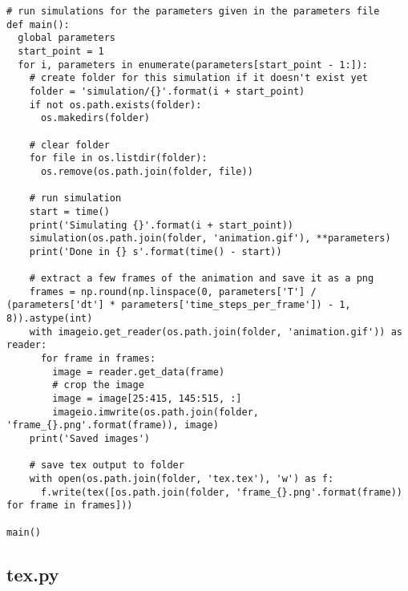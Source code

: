 \begin{verbatim}
# run simulations for the parameters given in the parameters file
def main():
  global parameters
  start_point = 1
  for i, parameters in enumerate(parameters[start_point - 1:]):
    # create folder for this simulation if it doesn't exist yet
    folder = 'simulation/{}'.format(i + start_point)
    if not os.path.exists(folder):
      os.makedirs(folder)
    
    # clear folder
    for file in os.listdir(folder):
      os.remove(os.path.join(folder, file))

    # run simulation
    start = time()
    print('Simulating {}'.format(i + start_point))
    simulation(os.path.join(folder, 'animation.gif'), **parameters)
    print('Done in {} s'.format(time() - start))

    # extract a few frames of the animation and save it as a png
    frames = np.round(np.linspace(0, parameters['T'] / (parameters['dt'] * parameters['time_steps_per_frame']) - 1, 8)).astype(int)
    with imageio.get_reader(os.path.join(folder, 'animation.gif')) as reader:
      for frame in frames:
        image = reader.get_data(frame)
        # crop the image
        image = image[25:415, 145:515, :]
        imageio.imwrite(os.path.join(folder, 'frame_{}.png'.format(frame)), image)
    print('Saved images')

    # save tex output to folder
    with open(os.path.join(folder, 'tex.tex'), 'w') as f:
      f.write(tex([os.path.join(folder, 'frame_{}.png'.format(frame)) for frame in frames]))

main()
\end{verbatim}

\subsection{tex.py}

